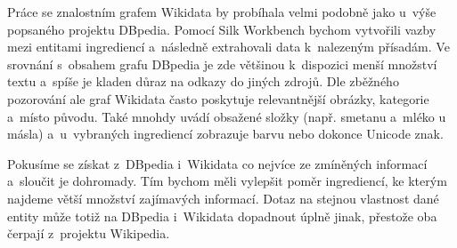Práce se znalostním grafem Wikidata by probíhala velmi podobně jako u~výše popsaného projektu DBpedia. Pomocí Silk Workbench bychom vytvořili vazby mezi entitami ingrediencí a~následně extrahovali data k~nalezeným přísadám. Ve srovnání s~obsahem grafu DBpedia je zde většinou k~dispozici menší množství textu a~spíše je kladen důraz na odkazy do jiných zdrojů. Dle zběžného pozorování ale graf Wikidata často poskytuje relevantnější obrázky, kategorie a~místo původu. Také mnohdy uvádí obsažené složky (např. smetanu a~mléko u másla) a~u~vybraných ingrediencí zobrazuje barvu nebo dokonce Unicode znak.

Pokusíme se získat z~DBpedia i~Wikidata co nejvíce ze zmíněných informací a~sloučit je dohromady. Tím bychom měli vylepšit poměr ingrediencí, ke kterým najdeme větší množství zajímavých informací. Dotaz na stejnou vlastnost dané entity může totiž na DBpedia i~Wikidata dopadnout úplně jinak, přestože oba čerpají z~projektu Wikipedia.

